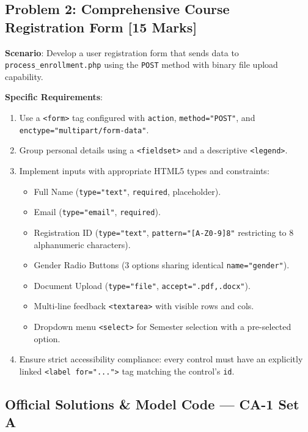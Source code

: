 \subsection*{Problem 2: Comprehensive Course Registration Form [15 Marks]}
\noindent
\textbf{Scenario}: Develop a user registration form that sends data to \texttt{process\_enrollment.php} using the \texttt{POST} method with binary file upload capability.

\noindent\textbf{Specific Requirements}:
\begin{enumerate}[label=(\alph*), leftmargin=8mm]
  \item Use a \texttt{<form>} tag configured with \texttt{action}, \texttt{method="POST"}, and \texttt{enctype="multipart/form-data"}.
  \item Group personal details using a \texttt{<fieldset>} and a descriptive \texttt{<legend>}.
  \item Implement inputs with appropriate HTML5 types and constraints:
    \begin{itemize}
      \item Full Name (\texttt{type="text"}, \texttt{required}, placeholder).
      \item Email (\texttt{type="email"}, \texttt{required}).
      \item Registration ID (\texttt{type="text"}, \texttt{pattern="[A-Z0-9]{8}"} restricting to 8 alphanumeric characters).
      \item Gender Radio Buttons (3 options sharing identical \texttt{name="gender"}).
      \item Document Upload (\texttt{type="file"}, \texttt{accept=".pdf,.docx"}).
      \item Multi-line feedback \texttt{<textarea>} with visible rows and cols.
      \item Dropdown menu \texttt{<select>} for Semester selection with a pre-selected option.
    \end{itemize}
  \item Ensure strict accessibility compliance: every control must have an explicitly linked \texttt{<label for="...">} tag matching the control's \texttt{id}.
\end{enumerate}

\newpage
\subsection*{Official Solutions \& Model Code --- CA-1 Set A}


